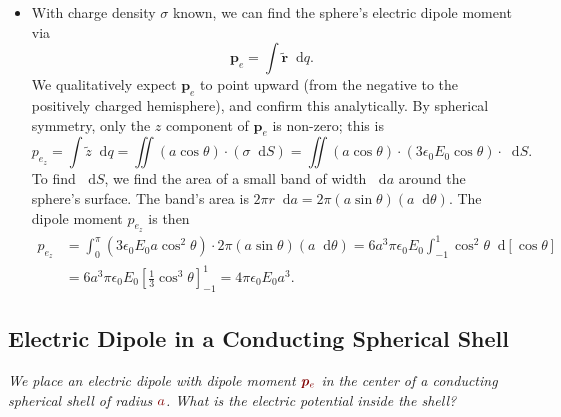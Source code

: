 \documentclass[11pt, a4paper]{article}
\newcommand{\diff}{\mathop{}\!\mathrm{d}} %
\newcommand{\dmath}[1]{\textcolor{Maroon}{#1}}  %
\renewcommand{\vec}[1]{\bm{#1}} %
\newcommand{\tvec}[1]{\tilde{\vec{#1}}} %
\newcommand{\ee}{\epsilon_{0}}  %
\newcommand{\pe}{\vec{p}_{e}}  %
\begin{document}
\begin{itemize}
	\item With charge density $ \sigma $ known, we can find the sphere's electric dipole moment via
	\begin{equation*}
		\vec{p}_{e} = \int \tvec{r} \diff q.
	\end{equation*}
	We qualitatively expect $ \vec{p}_{e} $ to point upward (from the negative to the positively charged hemisphere), and confirm this analytically. By spherical symmetry, only the $ z $ component of $ \vec{p}_{e} $ is non-zero; this is
	\begin{equation*}
		p_{e_{z}} = \int \tilde{z} \diff q = \iint (a \cos \theta) \cdot (\sigma \diff S) = \iint( a \cos \theta) \cdot (3 \ee E_{0} \cos \theta) \cdot \diff S.
	\end{equation*}
	To find $ \diff S $, we find the area of a small band of width $ \diff a $ around the sphere's surface. The band's area is $ 2\pi r \diff a = 2\pi (a \sin \theta ) (a \diff \theta) $. The dipole moment $ p_{e_{z}} $ is then
	\begin{align*}
		p_{e_{z}} &= \int_{0}^{\pi}(3\ee E_{0}a\cos^{2}\theta) \cdot 2\pi (a \sin \theta ) (a \diff \theta) = 6a^{3}\pi \ee E_{0} \int_{-1}^{1}\cos^{2}\theta \diff [\cos \theta]\\
		& = 6a^{3}\pi \ee E_{0} \left[\frac{1}{3}\cos^{3}\theta \right]_{-1}^{1} = 4\pi \ee E_{0} a^{3}.
	\end{align*}
\end{itemize}

\subsection{Electric Dipole in a Conducting Spherical Shell}
\textit{We place an electric dipole with dipole moment $ \dmath{\pe} $ in the center of a conducting spherical shell of radius $ \dmath{a} $. What is the electric potential inside the shell?}
\end{document}
